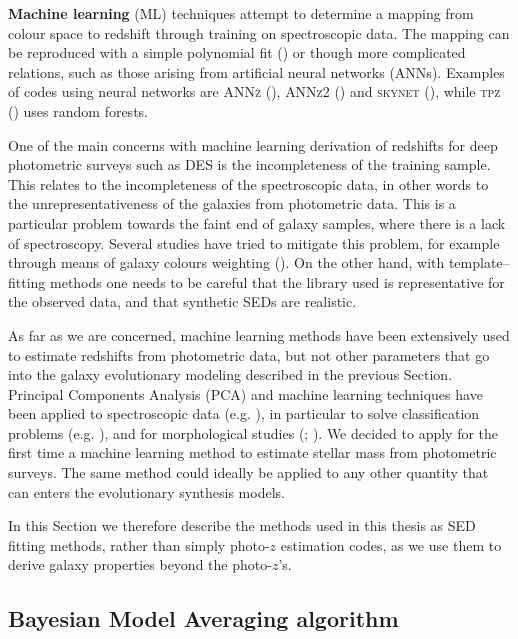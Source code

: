 {\bf Machine learning} (ML) techniques attempt to determine a mapping from colour space to redshift through training on spectroscopic data. The mapping can be reproduced with a simple polynomial fit (\citealt{connolly}) or though more complicated relations, such as those arising from artificial neural networks (ANNs). Examples of codes using neural networks are \textsc{ANNz} (\citealt{annz}), \textsc{ANNz2} (\citealt{annz2}) and \textsc{skynet} (\citealt{skynet}), while \textsc{tpz} (\citealt{tpz}) uses random forests.

One of the main concerns with machine learning derivation of redshifts for deep photometric surveys such as DES is the incompleteness of the training sample. This relates to the incompleteness of the spectroscopic data, in other words to the unrepresentativeness of the galaxies from photometric data. This is a particular problem towards the faint end of galaxy samples, where there is a lack of spectroscopy. Several studies have tried to mitigate this problem, for example through means of galaxy colours weighting (\citealt{lima}). On the other hand, with template--fitting methods one needs to be careful that the library used is representative for the observed data, and that synthetic SEDs are realistic.

As far as we are concerned, machine learning methods have been extensively used to estimate redshifts from photometric data, but not other parameters  that go into the galaxy evolutionary modeling described in the previous Section. Principal Components Analysis (PCA) and machine learning techniques have been applied to spectroscopic data (e.g. \citealt{wisconsin}), in particular to solve classification problems (e.g. \citealt{quenching}), and for morphological studies (\citealt{gauci}; \citealt{schutter}). We decided to apply for the first time a machine learning method to estimate stellar mass from photometric surveys. The same method could ideally be applied to any other quantity that can enters the evolutionary synthesis models.

In this Section we therefore describe the methods used in this thesis as SED fitting methods, rather than simply photo-$z$ estimation codes, as we use them to derive galaxy properties beyond the photo-$z$'s. 

\subsection{Bayesian Model Averaging algorithm}\label{sec:BMA}

